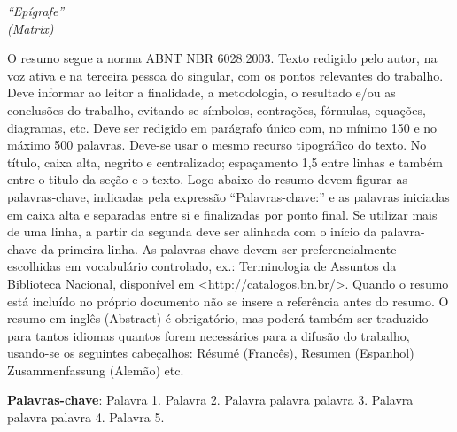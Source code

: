 \documentclass[
	12pt,				%
	openright,			%
	twoside,			%
	a4paper,			%
	chapter=TITLE,		%
	sumario=abnt-6027-2012,
	english,			%
	brazil				%
	]{UFVJM-abntex2}
\begin{document}

\begin{agradecimentos}
\setlength{\parskip}{\onelineskip}  %


\setlength{\parskip}{0.cm}  %
\end{agradecimentos}


\begin{epigrafe}
    \vspace*{\fill}
	\begin{flushright}
		\textit{``Epígrafe''\\
		(Matrix)}
	\end{flushright}
\end{epigrafe}


\begin{resumo}[RESUMO]

\noindent O resumo segue a norma ABNT NBR 6028:2003. Texto redigido pelo autor, na voz ativa e na terceira pessoa do singular, com os pontos relevantes do trabalho. Deve informar ao leitor a  finalidade, a metodologia, o resultado e/ou as conclusões do trabalho, evitando-se símbolos, contrações, fórmulas, equações, diagramas, etc. Deve ser redigido em parágrafo único com, no mínimo 150 e no máximo 500 palavras. Deve-se usar o mesmo recurso tipográfico do texto. No título, caixa alta, negrito e centralizado; espaçamento 1,5 entre linhas e também entre o titulo da seção e o texto. Logo abaixo do resumo devem figurar as palavras-chave, indicadas pela expressão “Palavras-chave:” e as palavras iniciadas em caixa alta e separadas entre si e finalizadas por ponto final. Se utilizar mais de uma linha, a partir da segunda deve ser alinhada com o início da palavra-chave da primeira linha. As palavras-chave devem ser preferencialmente escolhidas em vocabulário controlado, ex.: Terminologia de Assuntos da  Biblioteca Nacional, disponível em <http://catalogos.bn.br/>. Quando o resumo está incluído no próprio documento não se insere a referência antes do resumo. O resumo em inglês (Abstract) é obrigatório, mas poderá também ser traduzido para tantos idiomas quantos forem necessários para a difusão do trabalho, usando-se os seguintes cabeçalhos: Résumé (Francês), Resumen (Espanhol) Zusammenfassung (Alemão) etc.

\vspace{\onelineskip}
\noindent \textbf{Palavras-chave}: Palavra 1. Palavra 2. Palavra palavra palavra 3. Palavra palavra palavra 4. Palavra 5.

\end{resumo}
\end{document}
